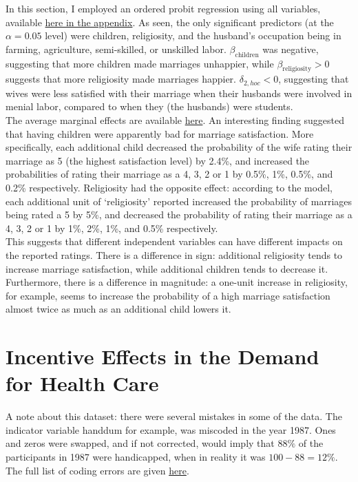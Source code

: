 \documentclass{article}
\begin{document}
\begin{enumerate}[label=(\alph*)]
In this section, I employed an ordered probit regression using all variables, available \hyperlink{oprobit}{here in the appendix}. As seen, the only significant predictors (at the $\alpha = 0.05$ level) were children, religiosity, and the husband's occupation being in farming, agriculture, semi-skilled, or unskilled labor. $\beta_{\text{children}}$ was negative, suggesting that more children made marriages unhappier, while $\beta_{\text{religiosity}} > 0$ suggests that more religiosity made marriages happier. $\delta_{2,hoc} < 0$, suggesting that wives were less satisfied with their marriage when their husbands were involved in menial labor, compared to when they (the husbands) were students.\\

The average marginal effects are available \hyperlink{oprobitame}{here}. An interesting finding suggested that having children were apparently bad for marriage satisfaction. More specifically, each additional child decreased the probability of the wife rating their marriage as 5 (the highest satisfaction level) by 2.4\%, and increased the probabilities of rating their marriage as a 4, 3, 2 or 1 by 0.5\%, 1\%, 0.5\%, and 0.2\% respectively. Religiosity had the opposite effect: according to the model, each additional unit of `religiosity' reported increased the probability of marriages being rated a 5 by 5\%, and decreased the probability of rating their marriage as a 4, 3, 2 or 1 by 1\%, 2\%, 1\%, and 0.5\% respectively.\\


This suggests that different independent variables can have different impacts on the reported ratings. There is a difference in sign: additional religiosity tends to increase marriage satisfaction, while additional children tends to decrease it. Furthermore, there is a difference in magnitude: a one-unit increase in religiosity, for example, seems to increase the probability of a high marriage satisfaction almost twice as much as an additional child lowers it. 

 

\end{enumerate}


\newpage
\section{Incentive Effects in the Demand for Health Care}

A note about this dataset: there were several mistakes in some of the data. The indicator variable handdum for example, was miscoded in the year 1987. Ones and zeros were swapped, and if not corrected, would imply that $88\%$ of the participants in 1987 were handicapped, when in reality it was $100 - 88 = 12\%$. The full list of coding errors are given \hyperlink{http://qed.econ.queensu.ca/jae/2003-v18.4/riphahn-wambach-million/readme.rwm.txt}{here}.\cite{riphahn2003incentive}
\end{document}
